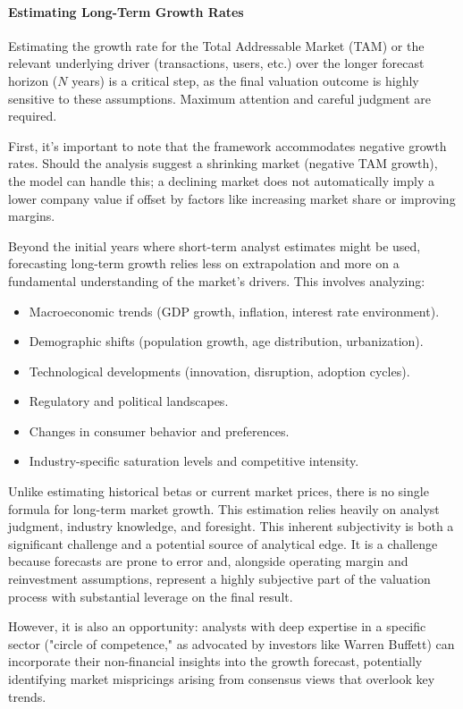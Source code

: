 \paragraph{Estimating Long-Term Growth Rates} \label{par:growth_estimates}
Estimating the growth rate for the Total Addressable Market (TAM) or the relevant underlying driver (transactions, users, etc.) over the longer forecast horizon (\(N\) years) is a critical step, as the final valuation outcome is highly sensitive to these assumptions. Maximum attention and careful judgment are required.

First, it's important to note that the framework accommodates negative growth rates. Should the analysis suggest a shrinking market (negative TAM growth), the model can handle this; a declining market does not automatically imply a lower company value if offset by factors like increasing market share or improving margins.

Beyond the initial years where short-term analyst estimates might be used, forecasting long-term growth relies less on extrapolation and more on a fundamental understanding of the market's drivers. This involves analyzing:
\begin{itemize}
    \item Macroeconomic trends (GDP growth, inflation, interest rate environment).
    \item Demographic shifts (population growth, age distribution, urbanization).
    \item Technological developments (innovation, disruption, adoption cycles).
    \item Regulatory and political landscapes.
    \item Changes in consumer behavior and preferences.
    \item Industry-specific saturation levels and competitive intensity.
\end{itemize}

Unlike estimating historical betas or current market prices, there is no single formula for long-term market growth. This estimation relies heavily on analyst judgment, industry knowledge, and foresight. This inherent subjectivity is both a significant challenge and a potential source of analytical edge. It is a challenge because forecasts are prone to error and, alongside operating margin and reinvestment assumptions, represent a highly subjective part of the valuation process with substantial leverage on the final result. 

However, it is also an opportunity: analysts with deep expertise in a specific sector ("circle of competence," as advocated by investors like Warren Buffett) can incorporate their non-financial insights into the growth forecast, potentially identifying market mispricings arising from consensus views that overlook key trends.

